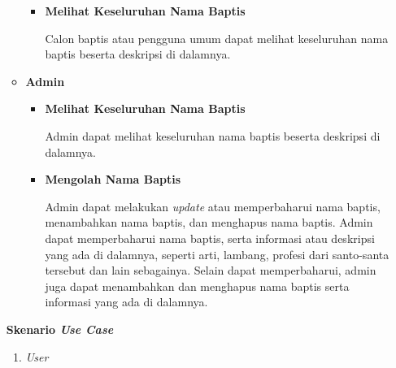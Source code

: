 \documentclass[a4paper,twoside]{article}
\begin{document}
\begin{enumerate}
\begin{itemize}
\begin{itemize}
					\item \textbf{Melihat Keseluruhan Nama Baptis}

					Calon baptis atau pengguna umum dapat melihat keseluruhan nama baptis beserta deskripsi di dalamnya.
				\end{itemize}
			\item \textbf{Admin}
				\begin{itemize}
				\item \textbf{Melihat Keseluruhan Nama Baptis}

					Admin dapat melihat keseluruhan nama baptis beserta deskripsi di dalamnya.
					
					\item \textbf{Mengolah Nama Baptis}

					Admin dapat melakukan \textit{update} atau memperbaharui nama baptis, menambahkan nama baptis, dan menghapus nama baptis. Admin dapat memperbaharui nama baptis, serta informasi atau deskripsi yang ada di dalamnya, seperti arti, lambang, profesi dari santo-santa tersebut dan lain sebagainya. Selain dapat memperbaharui, admin juga dapat menambahkan dan menghapus nama baptis serta informasi yang ada di dalamnya.


				\end{itemize}
	\end{itemize}
	
\textbf{Skenario \textit{Use Case}}
\label{sec:skenariousecase}
\begin{enumerate}
\item \textit{User}



\end{enumerate}
\end{enumerate}
\end{document}
